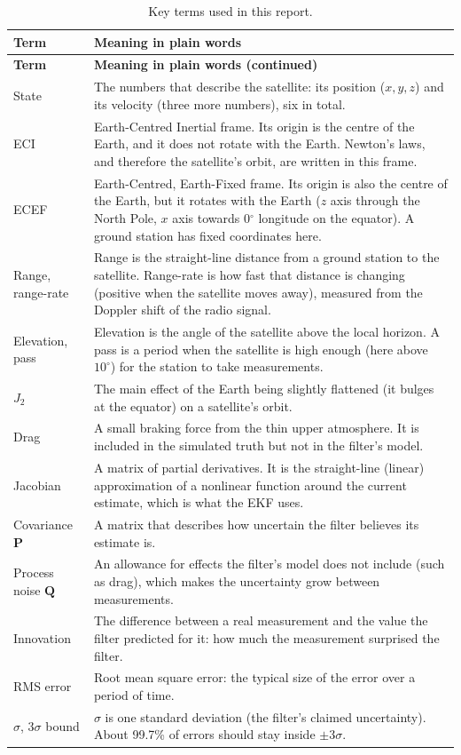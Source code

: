 \documentclass[11pt,a4paper]{article}
\newcommand{\bP}{\mathbf{P}}
\newcommand{\bQ}{\mathbf{Q}}
\begin{document}
\begin{longtable}{p{}p{}}
\caption{Key terms used in this report.}\label{tab:terms}\\
\toprule
\textbf{Term} & \textbf{Meaning in plain words} \\
\midrule
\endfirsthead
\toprule
\textbf{Term} & \textbf{Meaning in plain words (continued)} \\
\midrule
\endhead
\bottomrule
\endlastfoot
State & The numbers that describe the satellite: its position ($x,y,z$) and its velocity (three more numbers), six in total. \\
ECI & Earth-Centred Inertial frame. Its origin is the centre of the Earth, and it does not rotate with the Earth. Newton's laws, and therefore the satellite's orbit, are written in this frame. \\
ECEF & Earth-Centred, Earth-Fixed frame. Its origin is also the centre of the Earth, but it rotates with the Earth ($z$ axis through the North Pole, $x$ axis towards 0$^\circ$ longitude on the equator). A ground station has fixed coordinates here. \\
Range, range-rate & Range is the straight-line distance from a ground station to the satellite. Range-rate is how fast that distance is changing (positive when the satellite moves away), measured from the Doppler shift of the radio signal. \\
Elevation, pass & Elevation is the angle of the satellite above the local horizon. A pass is a period when the satellite is high enough (here above $10^\circ$) for the station to take measurements. \\
$J_2$ & The main effect of the Earth being slightly flattened (it bulges at the equator) on a satellite's orbit. \\
Drag & A small braking force from the thin upper atmosphere. It is included in the simulated truth but not in the filter's model. \\
Jacobian & A matrix of partial derivatives. It is the straight-line (linear) approximation of a nonlinear function around the current estimate, which is what the EKF uses. \\
Covariance $\bP$ & A matrix that describes how uncertain the filter believes its estimate is. \\
Process noise $\bQ$ & An allowance for effects the filter's model does not include (such as drag), which makes the uncertainty grow between measurements. \\
Innovation & The difference between a real measurement and the value the filter predicted for it: how much the measurement surprised the filter. \\
RMS error & Root mean square error: the typical size of the error over a period of time. \\
$\sigma$, $3\sigma$ bound & $\sigma$ is one standard deviation (the filter's claimed uncertainty). About 99.7\% of errors should stay inside $\pm3\sigma$. \\
\end{longtable}
\end{document}
